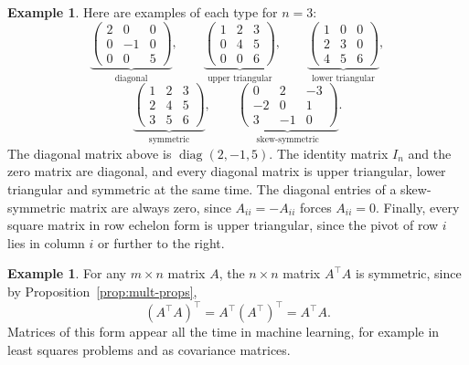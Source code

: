 \documentclass[11pt]{article}
\theoremstyle{definition}
\newtheorem{example}[definition]{Example}
\theoremstyle{plain}
\theoremstyle{remark}
\DeclareMathOperator{\diag}{diag}
\begin{document}
\begin{example}
    Here are examples of each type for $n = 3$:
    \[\underbrace{\begin{pmatrix}
        2 & 0 & 0 \\
        0 & -1 & 0 \\
        0 & 0 & 5
    \end{pmatrix}}_{\text{diagonal}}, \qquad \underbrace{\begin{pmatrix}
        1 & 2 & 3 \\
        0 & 4 & 5 \\
        0 & 0 & 6
    \end{pmatrix}}_{\text{upper triangular}}, \qquad \underbrace{\begin{pmatrix}
        1 & 0 & 0 \\
        2 & 3 & 0 \\
        4 & 5 & 6
    \end{pmatrix}}_{\text{lower triangular}},\]
    \[\underbrace{\begin{pmatrix}
        1 & 2 & 3 \\
        2 & 4 & 5 \\
        3 & 5 & 6
    \end{pmatrix}}_{\text{symmetric}}, \qquad \underbrace{\begin{pmatrix}
        0 & 2 & -3 \\
        -2 & 0 & 1 \\
        3 & -1 & 0
    \end{pmatrix}}_{\text{skew-symmetric}}.\]
    The diagonal matrix above is $\diag(2, -1, 5)$. The identity matrix $I_n$ and the zero matrix are diagonal, and every diagonal matrix is upper triangular, lower triangular and symmetric at the same time. The diagonal entries of a skew-symmetric matrix are always zero, since $A_{ii} = -A_{ii}$ forces $A_{ii} = 0$. Finally, every square matrix in row echelon form is upper triangular, since the pivot of row $i$ lies in column $i$ or further to the right.
\end{example}

\begin{example}
    For any $m \times n$ matrix $A$, the $n \times n$ matrix $A^\top A$ is symmetric, since by Proposition~\ref{prop:mult-props},
    \[(A^\top A)^\top = A^\top (A^\top)^\top = A^\top A.\]
    Matrices of this form appear all the time in machine learning, for example in least squares problems and as covariance matrices.
\end{example}
\end{document}
